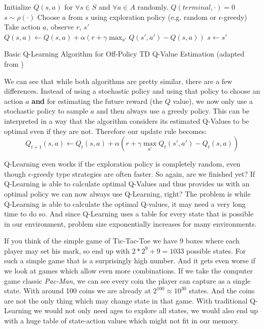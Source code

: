 \begin{algorithm}[ht]
  Initialize $Q(s, a)$ for $\forall s \in S$ and $\forall a \in A$ randomly. $Q(terminal, \cdot) = 0$ \;
   {
   $s \sim \rho(\cdot)$ \;
     {
    Choose $a$ from $s$ using exploration policy (e.g. random or $\epsilon$-greedy) \;
     Take action $a$, observe $r$, $s'$ \;
     $Q(s, a) \leftarrow Q(s, a) + \alpha (r + \gamma\max_{a'} Q(s', a') - Q(s, a))$ \;
     $s \leftarrow s'$\;
   }
 }
  \caption[The Q-Learning Algorithm]{Basic Q-Learning Algorithm for Off-Policy TD Q-Value Estimation (adapted from \cite{sutton2018reinforcement})}\label{alg:QLearning}
 \end{algorithm}

We can see that while both algorithms are pretty similar, there are a few differences. Instead of using a stochastic policy and using that policy to choose an action $a$ \textbf{and} for estimating the future reward (the $Q$ value), we now only use a stochastic policy to sample $a$ and then always use a greedy policy. This can be interpreted in a way that the algorithm considers its estimated Q-Values to be optimal even if they are not. Therefore our update rule becomes: 
\[Q_{t+1}(s, a) \leftarrow Q_t(s, a) + \alpha (r + \gamma\max_{a'} Q_t(s', a') - Q_t(s, a))\]

Q-Learning even works if the exploration policy is completely random, even though $\epsilon$-greedy type strategies are often faster. So again, are we finished yet? If Q-Learning is able to calculate optimal Q-Values and thus provides us with an optimal policy we can now always use Q-Learning, right? The problem is while Q-Learning is able to calculate the optimal Q-values, it may need a very long time to do so. And since Q-Learning uses a table for every state that is possible in our environment, problem size exponentially increases for many environments.

If you think of the simple game of Tic-Tac-Toe we have 9 boxes where each player may set his mark, so end up with $2*2^9+9=1033$ possible states. For such a simple game that is a surprisingly high number. And it gets even worse if we look at games which allow even more combinations. If we take the computer game classic \textit{Pac-Man}, we can see every coin the player can capture as a single state. With around 100 coins we are already at $2^{100} \approx 10^{30}$ states. And the coins are not the only thing which may change state in that game. With traditional Q-Learning we would not only need ages to explore all states, we would also end up with a huge table of state-action values which might not fit in our memory.

